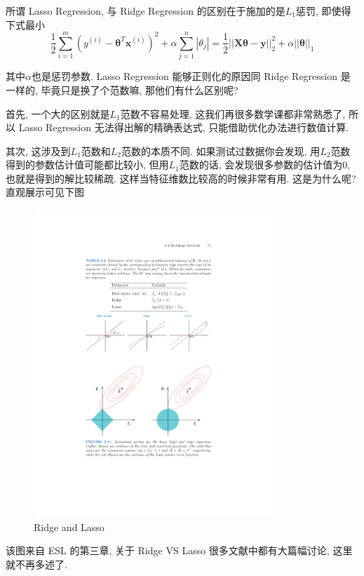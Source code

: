 \documentclass[a4paper,UTF8]{ctexart}
\theoremstyle{plain} \newtheorem{theorem}{定理}[section]
\theoremstyle{plain} \newtheorem{definition}{定义}[section]
\theoremstyle{plain} \newtheorem{lemma}{引理}[section]
\theoremstyle{plain} \newtheorem{proposition}{命题}[section]
\theoremstyle{plain} \newtheorem{example}{例}[section]
\theoremstyle{plain} \newtheorem{remark}{注}[section]
\theoremstyle{plain} \newtheorem{corollary}{推论}[section]
\begin{document}
所谓 Lasso Regression, 与 Ridge Regression 的区别在于施加的是$L_{1}$惩罚, 即使得下式最小
\begin{equation*}
\frac{1}{2}  \sum_{i=1}^{m} (y^{(i)} - \bm{\theta}^{T} \bm{x}^{(i)})^2  + \alpha \sum_{j=1}^{n} |\theta_{j}| = \frac{1}{2}||\bm{X} \bm{\theta} -\bm{y}||_{2}^{2} + \alpha ||\bm{\theta}||_{1}
\end{equation*}

其中$\alpha$也是惩罚参数. Lasso Regression 能够正则化的原因同 Ridge Regression 是一样的, 毕竟只是换了个范数嘛, 那他们有什么区别呢?

首先, 一个大的区别就是$L_{1}$范数不容易处理, 这我们再很多数学课都非常熟悉了, 所以 Lasso Regression 无法得出解的精确表达式, 只能借助优化办法进行数值计算.

其次, 这涉及到$L_{1}$范数和$L_{2}$范数的本质不同. 如果测试过数据你会发现, 用$L_{2}$范数得到的参数估计值可能都比较小, 但用$L_{1}$范数的话, 会发现很多参数的估计值为$0$, 也就是得到的解比较稀疏. 这样当特征维数比较高的时候非常有用. 这是为什么呢? 直观展示可见下图
\begin{figure}[!htb]
	\centering
	\includegraphics[width=0.80\textwidth]{norm.pdf}
	\caption{Ridge and Lasso}
	\label{norm}
\end{figure}

该图来自 ESL 的第三章, 关于 Ridge VS Lasso 很多文献中都有大篇幅讨论, 这里就不再多述了.
\end{document}

